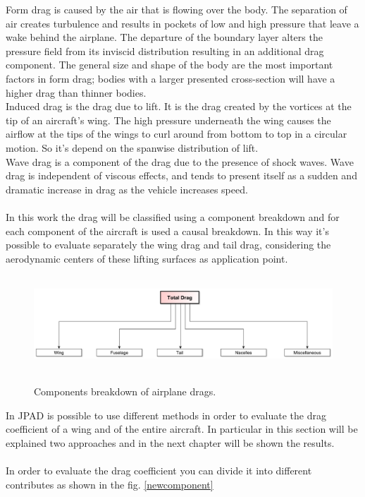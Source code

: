 Form drag is caused by the air that is flowing over the body. The separation of air creates turbulence and results in pockets of low and high pressure that leave a wake behind the airplane. The departure of the boundary layer alters the pressure field from its inviscid distribution resulting in an additional drag component. The general size and shape of the body are the most important factors in form drag; bodies with a larger presented cross-section will have a higher drag than thinner bodies.\\
Induced drag is the drag due to lift. It is the drag created by the vortices at the tip of an aircraft's wing. The high pressure underneath the wing causes the airflow at the tips of the wings to curl around from bottom to top in a circular motion. So it's depend on the spanwise distribution of lift. \\
Wave drag is a component of the drag due to the presence of shock waves. Wave drag is independent of viscous effects, and tends to present itself as a sudden and dramatic increase in drag as the vehicle increases speed.
\\ \\ 
In this work the drag will be classified using a component breakdown and for each component of the aircraft is used a causal breakdown. In this way it's possible to evaluate separately the wing drag and tail drag, considering the aerodynamic centers of these lifting surfaces as application point.
\begin{figure}[H]
\centering
{\includegraphics[height=3.6cm]{Immagini/dragco.pdf}} 
\caption{Components breakdown of airplane drags.}
\end{figure}
In JPAD is possible to use different methods in order to evaluate the drag coefficient of a wing and of the entire aircraft. In particular in this section will be explained two approaches and in the next chapter will be shown the results.\\ \\
In order to evaluate the drag coefficient you can divide it into different contributes as shown in the fig. \ref{newcomponent}

